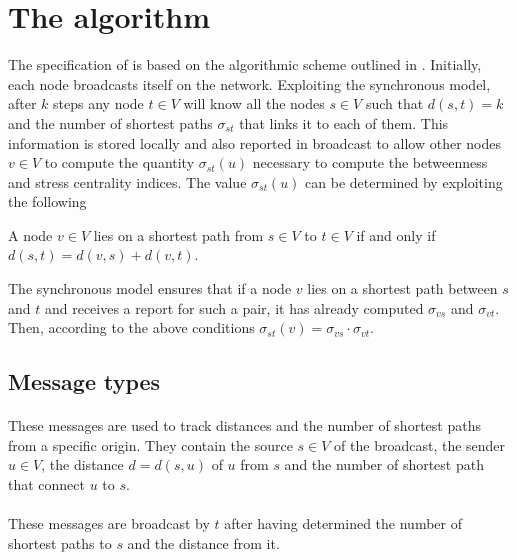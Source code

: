 
\section{The \deccen{} algorithm}

The specification of \deccen{} is based on the algorithmic scheme outlined in \cite{lehmann2003}. Initially, each node broadcasts itself on the network. Exploiting the synchronous model, after $k$ steps any node $t \in V$ will know all the nodes $s \in V$ such that $d(s,t) = k$ and the number of shortest paths  $\sigma_{st}$ that links it to each of them. This information is stored locally and also reported in broadcast to allow other nodes $v \in V$ to compute the quantity $\sigma_{st}(u)$ necessary to compute the betweenness and stress centrality indices. The value $\sigma_{st}(u)$ can be determined by exploiting the following

\begin{lemma}
A node $v \in V$ lies on a shortest path from $s \in V$ to $t \in V$ if and only if $d(s,t) = d(v,s) + d(v,t)$.
\end{lemma}

The synchronous model ensures that if a node $v$ lies on a shortest path between $s$ and $t$ and receives a report for such a pair, it has already computed $\sigma_{vs}$ and $\sigma_{vt}$. Then, according to the above conditions $\sigma_{st}(v) = \sigma_{vs} \cdot \sigma_{vt}$.

\subsection{Message types}

\paragraph{} These messages are used to track distances and the number of shortest paths from a specific origin. They contain the source $s \in V$ of the broadcast, the sender $u \in V$, the distance $d = d(s,u)$ of $u$ from $s$ and the number of shortest path that connect $u$ to $s$.

\paragraph{} These messages are broadcast by $t$ after having determined the number of shortest paths to $s$ and the distance from it.

